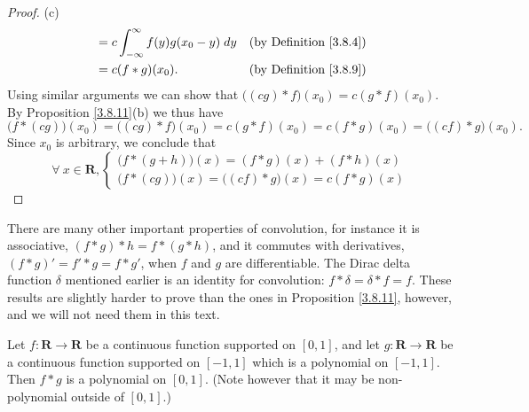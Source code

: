 \begin{proof}{(c)}
\begin{align*}
         & = c \int_{-\infty}^\infty f(y) g(x_0 - y) \; dy     & \text{(by Definition \ref{3.8.4})} \\
         & = c (f * g)(x_0).                                   & \text{(by Definition \ref{3.8.9})}
    \end{align*}
    Using similar arguments we can show that \(\big((cg) * f\big)(x_0) = c (g * f)(x_0)\).
    By Proposition \ref{3.8.11}(b) we thus have
    \[
        \big(f * (cg)\big)(x_0) = \big((cg) * f\big)(x_0) = c(g * f)(x_0) = c(f * g)(x_0) = \big((cf) * g\big)(x_0).
    \]
    Since \(x_0\) is arbitrary, we conclude that
    \[
        \forall\ x \in \mathbf{R}, \begin{cases}
            \big(f * (g + h)\big)(x) = (f * g)(x) + (f * h)(x) \\
            \big(f * (cg)\big)(x) = \big((cf) * g\big)(x) = c(f * g)(x)
        \end{cases}
    \]
\end{proof}

\begin{remark}\label{3.8.12}
    There are many other important properties of convolution, for instance it is associative, \((f * g) * h = f * (g * h)\), and it commutes with derivatives, \((f * g)' = f' * g = f * g'\), when \(f\) and \(g\) are differentiable.
    The Dirac delta function \(\delta\) mentioned earlier is an identity for convolution:
    \(f * \delta = \delta * f = f\).
    These results are slightly harder to prove than the ones in Proposition \ref{3.8.11}, however, and we will not need them in this text.
\end{remark}

\begin{lemma}\label{3.8.13}
    Let \(f : \mathbf{R} \to \mathbf{R}\) be a continuous function supported on \([0, 1]\), and let \(g : \mathbf{R} \to \mathbf{R}\) be a continuous function supported on \([-1, 1]\) which is a polynomial on \([-1, 1]\).
    Then \(f * g\) is a polynomial on \([0, 1]\).
    (Note however that it may be non-polynomial outside of \([0, 1].\))
\end{lemma}

